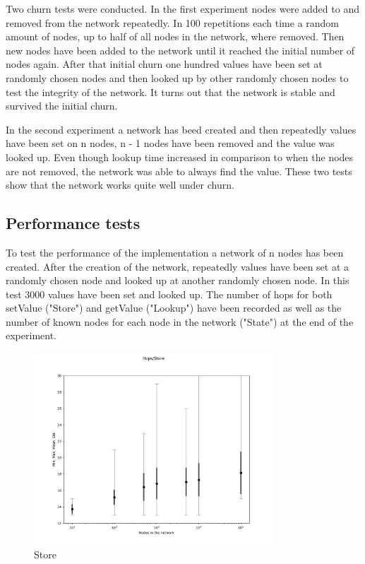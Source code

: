 \documentclass[a4paper, 12pt]{article} %
\begin{document}
Two churn tests were conducted. In the first experiment nodes were added to and removed from the network repeatedly. In 100 repetitions each time a random amount of nodes, up to half of all nodes in the network, where removed. Then new nodes have been added to the network until it reached the initial number of nodes again.  After that initial churn one hundred values have been set at randomly chosen nodes and then looked up by other randomly chosen nodes to test the integrity of the network. It turns out that the network is stable and survived the initial churn.

In the second experiment a network has beed created and then repeatedly values have been set on n nodes, n - 1 nodes have been removed and the value was looked up. Even though lookup time increased in comparison to when the nodes are not removed, the network was able to always find the value. These two tests show that the network works quite well under churn.

\subsection{Performance tests}

To test the performance of the implementation a network of n nodes has been created. After the creation of the network, repeatedly values have been set at a randomly chosen node and looked up at another randomly chosen node. In this test 3000 values have been set and looked up. The number of hops for both setValue ("Store") and getValue ("Lookup") have been recorded as well as the number of known nodes for each node in the network ("State") at the end of the experiment.


\begin{figure}[ht]
    \caption{Store}
    \centering
    \includegraphics[width=0.80\textwidth]{images/set_figure.png}
\end{figure}
\end{document}
